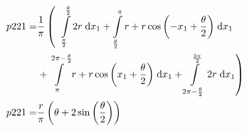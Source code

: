 \begin{align}
    p221 =&\frac{1}{\pi} \left(\;\;\int\limits_{\frac{\pi}{2}}^{\frac{\theta}{2}}2 r\;\mathrm{d}x_{1}+\int\limits_{\frac{\theta}{2}}^{\pi}r + r \cos{\left (- x_{1} + \frac{\theta}{2} \right )}\;\mathrm{d}x_{1}\right.\notag\\
 &\left.+\int\limits_{\pi}^{2 \pi - \frac{\theta}{2}}r + r \cos{\left (x_{1} + \frac{\theta}{2} \right )}\;\mathrm{d}x_{1}+\int\limits_{2 \pi - \frac{\theta}{2}}^{\frac{3 \pi}{2}}2 r\;\mathrm{d}x_{1}\right)\label{p221Def}\\
    p221 =& \frac{r}{\pi} \left(\theta + 2 \sin{\left (\frac{\theta}{2} \right )}\right)\label{p221Sln}
\end{align}